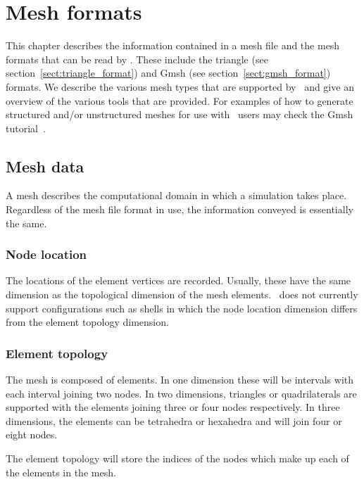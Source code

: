 \chapter{Mesh formats}\label{chap:meshes}

This chapter describes the information contained in a mesh file and the 
mesh formats that can be read by \fluidity. These include the triangle 
(see section~\ref{sect:triangle_format}) and Gmsh (see section~\ref{sect:gmsh_format}) 
formats. We describe the various mesh types that are supported by \fluidity\ and 
give an overview of the various tools that are provided. For 
examples of how to generate structured and/or unstructured meshes for use with
\fluidity\, users may check the Gmsh tutorial~\cite{amcggmshtutorial}.

\section{Mesh data}

A mesh describes the computational domain in which a simulation takes
place. Regardless of the mesh file format in use, the information conveyed
is essentially the same.

\subsection{Node location}

The locations of the element vertices are recorded. Usually, these have the
same dimension as the topological dimension of the mesh elements. \fluidity\
does not currently support configurations such as shells in which the node
location dimension differs from the element topology dimension.

\subsection{Element topology}

The mesh is composed of elements. In one dimension these will be intervals
with each interval joining two nodes. In two dimensions, triangles or
quadrilaterals are supported with the elements joining three or four nodes
respectively. In three dimensions, the elements can be tetrahedra or
hexahedra and will join four or eight nodes.

The element topology will store the indices of the nodes which make up
each of the elements in the mesh.


